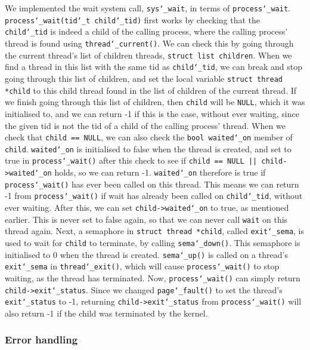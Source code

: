 \documentclass{article}
\renewcommand{\_}{\char`_}
\begin{document}
We implemented the wait system call, \texttt{sys\_wait}, in terms of \texttt{process\_wait}. \texttt{process\_wait(tid\_t child\_tid)} first works by checking that the \texttt{child\_tid} is indeed a child of the calling process, where the calling process' thread is found using \texttt{thread\_current()}. We can check this by going through the current thread's list of children threads, \texttt{struct list children}. When we find a thread in this list with the same tid as \texttt{child\_tid}, we can break and stop going through this list of children, and set the local variable \texttt{struct thread *child} to this child thread found in the list of children of the current thread. If we finish going through this list of children, then \texttt{child} will be \texttt{NULL}, which it was initialised to, and we can return -1 if this is the case, without ever waiting, since the given tid is not the tid of a child of the calling process' thread. When we check that \texttt{child == NULL}, we can also check the \texttt{bool waited\_on} member of \texttt{child}. \texttt{waited\_on} is initialised to false when the thread is created, and set to true in \texttt{process\_wait()} after this check to see if \texttt{child == NULL || child->waited\_on} holds, so we can return -1. \texttt{waited\_on} therefore is true if \texttt{process\_wait()} has ever been called on this thread. This means we can return -1 from \texttt{process\_wait()} if wait has already been called on \texttt{child\_tid}, without ever waiting. After this, we can set \texttt{child->waited\_on} to true, as mentioned earlier. This is never set to false again, so that we can never call \texttt{wait} on this thread again. Next, a semaphore in \texttt{struct thread *child}, called \texttt{exit\_sema}, is used to wait for \texttt{child} to terminate, by calling \texttt{sema\_down()}. This semaphore is initialised to 0 when the thread is created. \texttt{sema\_up()} is called on a thread's \texttt{exit\_sema} in \texttt{thread\_exit()}, which will cause \texttt{process\_wait()} to stop waiting, as the thread has terminated. Now, \texttt{process\_wait()} can simply return \texttt{child->exit\_status}. Since we changed \texttt{page\_fault()} to set the thread's \texttt{exit\_status} to -1, returning \texttt{child->exit\_status} from \texttt{process\_wait()} will also return -1 if the child was terminated by the kernel.

\subsubsection{Error handling}
\end{document}
